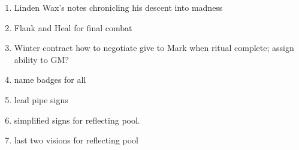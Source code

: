\documentclass[green]{gl2018}
\begin{document}
\name{\gGMToDo{}}

\begin{enumerate}
\item Linden Wax's notes chronicling his descent into madness
\item Flank and Heal for final combat
\item Winter contract how to negotiate give to Mark when ritual complete; assign ability to GM?
\item name badges for all
\item lead pipe signs
\item simplified signs for reflecting pool.
\item last two visions for reflecting pool

\end{enumerate}
\end{document}
